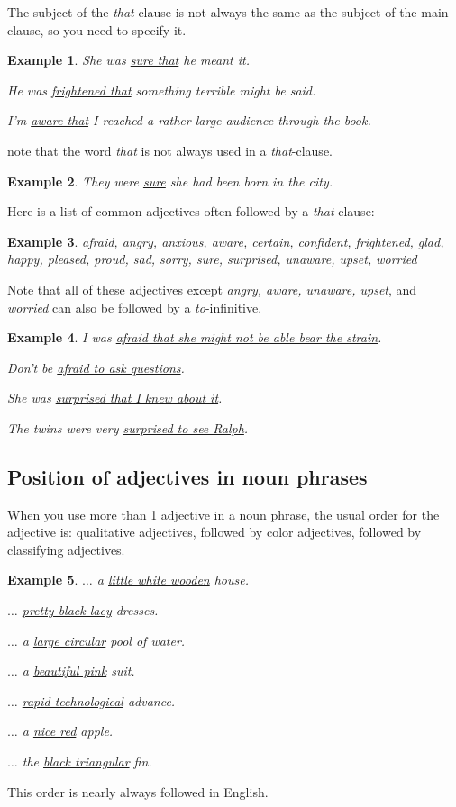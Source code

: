 \documentclass[oneside]{book}
\numberwithin{equation}{section}
\newtheorem{example}{Example}[section]
\begin{document}
The subject of the \textit{that}-clause is not always the same as the subject of the main clause, so you need to specify it.
\begin{example}
    She was \underline{sure that} he meant it.
    
    He was \underline{frightened that} something terrible might be said.
    
    I'm \underline{aware that} I reached a rather large audience through the book.
\end{example}
note that the word \textit{that} is not always used in a \textit{that}-clause.
\begin{example}
    They were \underline{sure} she had been born in the city.
\end{example}
Here is a list of common adjectives often followed by a \textit{that}-clause:
\begin{example}
    afraid, angry, anxious, aware, certain, confident, frightened, glad, happy, pleased, proud, sad, sorry, sure, surprised, unaware, upset, worried
\end{example}
Note that all of these adjectives except \textit{angry, aware, unaware, upset}, and \textit{worried} can also be followed by a \textit{to}-infinitive.
\begin{example}
    I was \underline{afraid that she might not be able bear the strain}.
    
    Don't be \underline{afraid to ask questions}.
    
    She was \underline{surprised that I knew about it}.
    
    The twins were very \underline{surprised to see Ralph}.
\end{example}

\subsection{Position of adjectives in noun phrases}
\noindent{} When you use more than 1 adjective in a noun phrase, the usual order for the adjective is: qualitative adjectives, followed by color adjectives, followed by classifying adjectives.
\begin{example}
    $\ldots$ a \underline{little white wooden} house.
    
    $\ldots$ \underline{pretty black lacy} dresses.
    
    $\ldots$ a \underline{large circular} pool of water.
    
    $\ldots$ a \underline{beautiful pink} suit.
    
    $\ldots$ \underline{rapid technological} advance.
    
    $\ldots$ a \underline{nice red} apple.
    
    $\ldots$ the \underline{black triangular} fin.
\end{example}
This order is nearly always followed in English.
\end{document}

